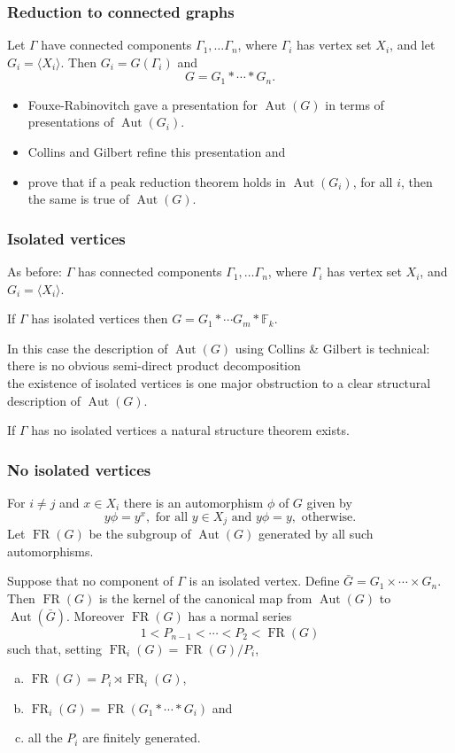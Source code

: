 \documentclass{beamer}
\newcommand{\la}{\langle}
\newcommand{\ra}{\rangle}
\def\FF{{\mathbb F}}
\def\G{\Gamma }
\newcommand{\FR}{\operatorname{FR}}
\newcommand{\Aut}{\operatorname{Aut}}
\newcommand{\be}{\begin{enumerate}}
\newcommand{\ee}{\end{enumerate}}
\newcommand{\bei}{\begin{itemize}}
\newcommand{\eei}{\end{itemize}}
\begin{document}
\begin{frame}
\frametitle{Reduction to connected graphs }
Let $\G$ have connected components $\G_1,\ldots \G_n$, where 
$\G_i$ has vertex set $X_i$, and let $G_i=\la X_i\ra$.  Then $G_i=G(\G_i)$ 
and
\[G=G_1\ast \cdots \ast G_n.\]

\pause 
\bei
\item
Fouxe-Rabinovitch gave a presentation for $\Aut(G)$ in terms of
presentations of $\Aut(G_i)$.\pause
\item
 Collins and Gilbert refine this presentation and \pause 
\item
prove that if a peak reduction 
theorem holds in  $\Aut(G_i)$, for all $i$, then the same is true of $\Aut(G)$. 
\eei
\end{frame}
\begin{frame}
\frametitle{Isolated vertices}
As before: $\G$ has connected components $\G_1,\ldots \G_n$, where 
$\G_i$ has vertex set $X_i$, and   $G_i=\la X_i\ra$.\\[1em]\pause

If $\G$ has isolated vertices then $G=G_1\ast \cdots G_m\ast \FF_k$.\\[1em] \pause

In this case the description of $\Aut(G)$ using Collins \& Gilbert is technical: there
is no obvious semi-direct product decomposition\\[1em]\pause
 the existence
of isolated vertices is one major obstruction to a clear structural description
of $\Aut(G)$.\\[1em]\pause

If $\G$ has no isolated vertices a natural structure theorem exists. 
\end{frame}
\begin{frame}
\frametitle{No isolated vertices}

For $i\neq j$ and $x\in X_i$ there is an automorphism $\phi$ of $G$ given by
\[y\phi =y^x, \textrm{ for all } y\in X_j \textrm{ and } y\phi = y, 
\textrm{ otherwise}.\]
Let $\FR(G)$ be the subgroup of $\Aut(G)$ generated by all such automorphisms.

\pause
\begin{theorem}
\label{theorem:FRker}
Suppose that no component of $\G$ is an isolated vertex. 
Define $\bar G=G_1\times \cdots \times G_n$. 
Then 
$\FR(G)$ is the kernel of the
canonical map from $\Aut(G)$ to $\Aut(\bar G)$. Moreover $\FR(G)$ has a normal 
series 
\[
1<P_{n-1}<\cdots <P_2<\FR(G)
\]
such that, setting $\FR_i(G)=\FR(G)/P_i$, 
\be[(a)]
\item $\FR(G)=P_i \rtimes \FR_i(G)$, 
\item $\FR_i(G)=\FR(G_1\ast \cdots \ast G_i)$ and
\item all the $P_i$ are finitely generated.
\ee
\end{theorem}
\end{frame}
\end{document}
